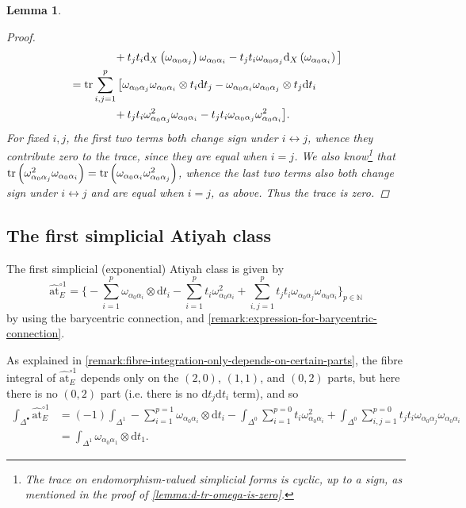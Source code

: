 \documentclass[11pt,fleqn]{article}
\theoremstyle{plain}
\newtheorem{lemma}[theorem]{Lemma}
\theoremstyle{definition}
\theoremstyle{remark}
\numberwithin{equation}{theorem}
\newcommand{\at}{\mathrm{at}}
\newcommand{\simpexpat}[1]{\hat{\at}^{\circ#1}}
\renewcommand{\d}{\mathrm{d}}
\begin{document}
\begin{lemma}
\begin{proof}
\begin{align*}
                    &\qquad\qquad + t_jt_i\d_X\left(\omega_{\alpha_0\alpha_j}\right)\omega_{\alpha_0\alpha_i} - t_jt_i\omega_{\alpha_0\alpha_j}\d_X\left(\omega_{\alpha_0\alpha_i}\right)\big]\\
                    &= \tr\sum_{i,j=1}^p\big[\omega_{\alpha_0\alpha_j}\omega_{\alpha_0\alpha_i}\otimes t_i\d t_j - \omega_{\alpha_0\alpha_i}\omega_{\alpha_0\alpha_j}\otimes t_j\d t_i\\
                    &\qquad\qquad + t_jt_i\omega_{\alpha_0\alpha_j}^2\omega_{\alpha_0\alpha_i} - t_jt_i\omega_{\alpha_0\alpha_j}\omega_{\alpha_0\alpha_i}^2\big].
                \end{align*}
                For fixed $i,j$, the first two terms both change sign under $i\leftrightarrow j$, whence they contribute zero to the trace, since they are equal when $i=j$.
                We also know\footnote{The trace on endomorphism-valued simplicial forms is cyclic, up to a sign, as mentioned in the proof of \cref{lemma:d-tr-omega-is-zero}.} that $\tr\left(\omega_{\alpha_0\alpha_j}^2\omega_{\alpha_0\alpha_i}\right)=\tr\left(\omega_{\alpha_0\alpha_i}\omega_{\alpha_0\alpha_j}^2\right)$, whence the last two terms also both change sign under $i\leftrightarrow j$ and are equal when $i=j$, as above.
                Thus the trace is zero.
            \end{proof}
        \end{lemma}

    \subsection{The first simplicial Atiyah class}

        The first simplicial (exponential) Atiyah class is given by
        \begin{equation}
            \simpexpat{1}_E = \Bigg\{-\sum_{i=1}^p\omega_{\alpha_0\alpha_i}\otimes\d t_i - \sum_{i=1}^pt_i\omega_{\alpha_0\alpha_i}^2 + \sum_{i,j=1}^p t_jt_i\omega_{\alpha_0\alpha_j}\omega_{\alpha_0\alpha_i}\Bigg\}_{p\in\mathbb{N}}
        \end{equation}
        by using the barycentric connection, and \cref{remark:expression-for-barycentric-connection}.

        As explained in \cref{remark:fibre-integration-only-depends-on-certain-parts}, the fibre integral of $\simpexpat{1}_E$ depends only on the $(2,0)$, $(1,1)$, and $(0,2)$ parts, but here there is no $(0,2)$ part (i.e. there is no $\d t_j\d t_i$ term), and so
        \begin{align}
            \int_{\Delta^\bullet}\simpexpat{1}_E &= (-1)\int_{\Delta^1}-\sum_{i=1}^{p=1}\omega_{\alpha_0\alpha_i}\otimes\d t_i - \int_{\Delta^0}\sum_{i=1}^{p=0}t_i\omega_{\alpha_0\alpha_i}^2 + \int_{\Delta^0}\sum_{i,j=1}^{p=0} t_jt_i\omega_{\alpha_0\alpha_j}\omega_{\alpha_0\alpha_i}
        \nonumber
        \\  &= \int_{\Delta^1}\omega_{\alpha_0\alpha_1}\otimes\d t_1.
        \end{align}
\end{document}
